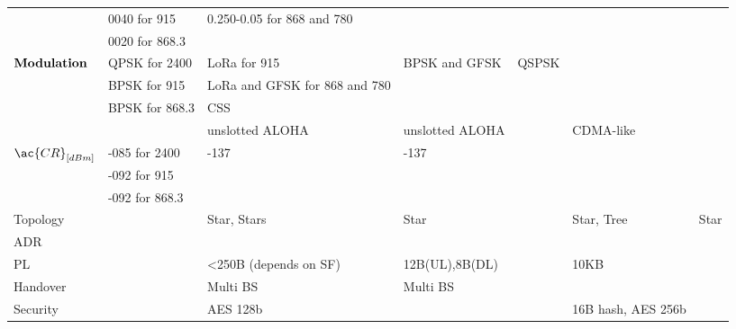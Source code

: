 \begin{table}[!ht]
\begin{tabulary}{\columnwidth}{L|L|L|L|L|L|L}
	\                                  & 0040 for 915   & 0.250-0.05     for 868 and 780  &               &             &                 &                 \\
	\                                  & 0020 for 868.3 &                                 &               &             &                 &                 \\\hline
	 & QPSK for 2400  & LoRa           for 915          & BPSK and GFSK & QSPSK       &                 &                 \\
	\                                  & BPSK for 915   & LoRa and GFSK  for 868  and 780 &               &             &                 &                 \\
	\                                  & BPSK for 868.3 & \ac{CSS}                        &               &             &                 &                 \\
	\                                  &                & unslotted ALOHA                 &unslotted ALOHA&             & CDMA-like       &                 \\\hline
	 & -085 for 2400  & -137                            & -137          &             &                 &                 \\
	\                                  & -092 for 915   &                                 &               &             &                 &                 \\
	\                                  & -092 for 868.3 &                                 &               &             &                 &                 \\\hline
	Topology                           &                & Star, Stars                     & Star          &             & Star, Tree      & Star            \\\hline
	\ac{ADR}                           &                &       \ok                       & \ko           &             & \ok             & \ko             \\\hline
	\ac{PL}                            &                & <250B (depends on SF)           & 12B(UL),8B(DL)&             & 10KB            &                 \\\hline
	Handover                           &                & Multi \ac{BS}                   & Multi \ac{BS} &             &                 &                 \\\hline
	Security                           &                & AES 128b                        & \ko           &             & 16B hash, AES 256b&               \\\hline

\end{tabulary}
\end{table}
